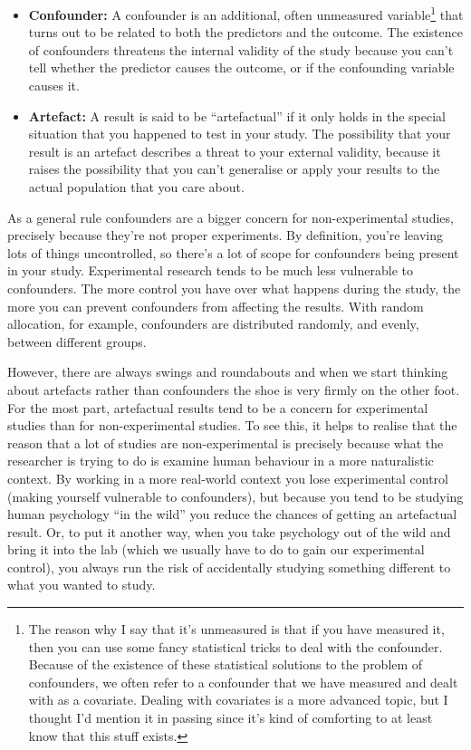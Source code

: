 \documentclass[
  letterpaper,
]{book}
\providecommand{\tightlist}{%
  \setlength{\itemsep}{0pt}\setlength{\parskip}{0pt}}\usepackage{longtable,booktabs,array}
\begin{document}
\begin{itemize}
\tightlist
\item
  \textbf{Confounder:} A confounder is an additional, often unmeasured
  variable\footnote{The reason why I say that it's unmeasured is that if
    you have measured it, then you can use some fancy statistical tricks
    to deal with the confounder. Because of the existence of these
    statistical solutions to the problem of confounders, we often refer
    to a confounder that we have measured and dealt with as a covariate.
    Dealing with covariates is a more advanced topic, but I thought I'd
    mention it in passing since it's kind of comforting to at least know
    that this stuff exists.} that turns out to be related to both the
  predictors and the outcome. The existence of confounders threatens the
  internal validity of the study because you can't tell whether the
  predictor causes the outcome, or if the confounding variable causes
  it.
\item
  \textbf{Artefact:} A result is said to be ``artefactual'' if it only
  holds in the special situation that you happened to test in your
  study. The possibility that your result is an artefact describes a
  threat to your external validity, because it raises the possibility
  that you can't generalise or apply your results to the actual
  population that you care about.
\end{itemize}

As a general rule confounders are a bigger concern for non-experimental
studies, precisely because they're not proper experiments. By
definition, you're leaving lots of things uncontrolled, so there's a lot
of scope for confounders being present in your study. Experimental
research tends to be much less vulnerable to confounders. The more
control you have over what happens during the study, the more you can
prevent confounders from affecting the results. With random allocation,
for example, confounders are distributed randomly, and evenly, between
different groups.

However, there are always swings and roundabouts and when we start
thinking about artefacts rather than confounders the shoe is very firmly
on the other foot. For the most part, artefactual results tend to be a
concern for experimental studies than for non-experimental studies. To
see this, it helps to realise that the reason that a lot of studies are
non-experimental is precisely because what the researcher is trying to
do is examine human behaviour in a more naturalistic context. By working
in a more real-world context you lose experimental control (making
yourself vulnerable to confounders), but because you tend to be studying
human psychology ``in the wild'' you reduce the chances of getting an
artefactual result. Or, to put it another way, when you take psychology
out of the wild and bring it into the lab (which we usually have to do
to gain our experimental control), you always run the risk of
accidentally studying something different to what you wanted to study.
\end{document}
